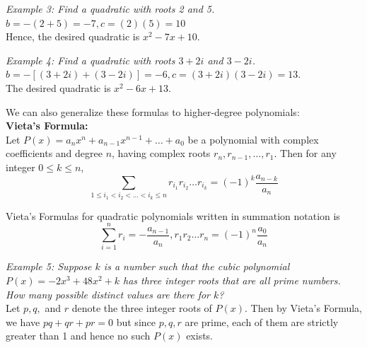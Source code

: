         \noindent \color{blue} \textit{Example 3: Find a quadratic with roots 2 and 5.} \color{black} \\
        $b=-(2+5)=-7, c=(2)(5)=10$ \\
        Hence, the desired quadratic is $x^2-7x+10$.

        \pagebreak
        \noindent \color{blue} \textit{Example 4: Find a quadratic with roots $3+2i$ and $3-2i$.} \color{black} \\
        \noindent $b=-[(3+2i)+(3-2i)] = -6,c=(3+2i)(3-2i)=13$. \\
        \noindent The desired quadratic is $x^2-6x+13$.

        \noindent We can also generalize these formulas to higher-degree polynomials: \\
        \noindent \color{purple} \textbf{Vieta's Formula:} \color{black} \\
        Let $P(x)=a_n x^n + a_{n-1}x^{n-1}+\dots+a_0$ be a polynomial with complex coefficients
        and degree $n$, having complex roots $r_n, r_{n-1},\dots,r_1$. Then for any integer
        $0\leq k \leq n$, \\

        \begin{equation*}
            \sum\limits_{1\leq i_1 < i_2<\dots<i_k\leq n}   r_{i_1}r_{i_2}\dots r_{i_k}
            = (-1)^k \frac{a_{n-k}}{a_n}
        \end{equation*}

        \noindent Vieta's Formulas for quadratic polynomials written in summation notation is \\
        \begin{equation*}
            \sum\limits_{i=1}^n r_i     = -\frac{a_{n-1}}{a_n}, r_1r_2\dots r_n=(-1)^n\frac{a_0}{a_n}
        \end{equation*}

        \noindent \color{blue} \textit{Example 5: Suppose $k$ is a number such that the cubic
        polynomial $P(x)=-2x^3+48x^2+k$ has three integer roots that are all prime numbers. How
        many possible distinct values are there for $k$?} \color{black} \\

        \noindent Let $p,q,$ and $r$ denote the three integer roots of $P(x)$. Then by Vieta's
        Formula, we have $pq+qr+pr=0$ but since $p,q,r$ are prime, each of them are strictly
        greater than 1 and hence no such $P(x)$ exists.